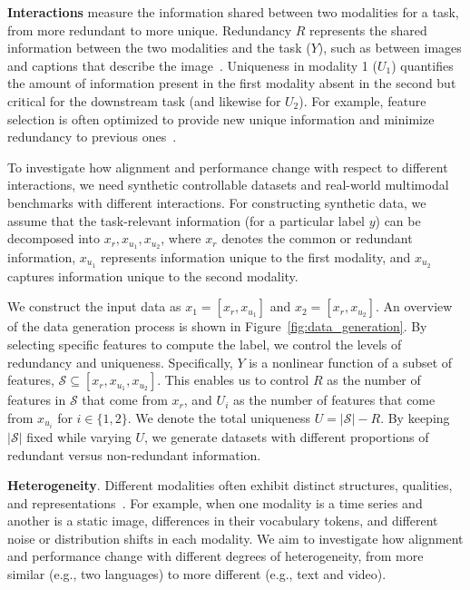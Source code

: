 \textbf{Interactions} measure the information shared between two modalities for a task, from more redundant to more unique. Redundancy \(R\) represents the shared information between the two modalities and the task (\(Y\)), such as between images and captions that describe the image~\citep{radford2021learning}. Uniqueness in modality 1 (\(U_1\)) quantifies the amount of information present in the first modality absent in the second but critical for the downstream task (and likewise for \(U_2\)). For example, feature selection is often optimized to provide new unique information and minimize redundancy to previous ones~\citep{peng2005feature}.


To investigate how alignment and performance change with respect to different interactions, we need synthetic controllable datasets and real-world multimodal benchmarks with different interactions. For constructing synthetic data, we assume that the task-relevant information (for a particular label \(y\)) can be decomposed into \(x_r, x_{u_1}, x_{u_2}\), where \(x_r\) denotes the common or redundant information, \(x_{u_1}\) represents information unique to the first modality, and \(x_{u_2}\) captures information unique to the second modality.

We construct the input data as \(x_1 = [x_r, x_{u_1}]\) and \(x_2 = [x_r, x_{u_2}]\). An overview of the data generation process is shown in Figure~\ref{fig:data_generation}. By selecting specific features to compute the label, we control the levels of redundancy and uniqueness. Specifically, \(Y\) is a nonlinear function of a subset of features, \(\mathcal{S} \subseteq [x_r, x_{u_1}, x_{u_2}]\). This enables us to control \(R\) as the number of features in \(\mathcal{S}\) that come from \(x_r\), and \(U_i\) as the number of features that come from \(x_{u_i}\) for $i \in \{1,2\}$. We denote the total uniqueness \(U = |\mathcal{S}| - R\). By keeping \(|\mathcal{S}|\) fixed while varying \(U\), we generate datasets with different proportions of redundant versus non-redundant information.

\textbf{Heterogeneity}. Different modalities often exhibit distinct structures, qualities, and representations~\cite{liang2024foundations}. For example, when one modality is a time series and another is a static image, differences in their vocabulary tokens, and different noise or distribution shifts in each modality. We aim to investigate how alignment and performance change with different degrees of heterogeneity, from more similar (e.g., two languages) to more different (e.g., text and video).

